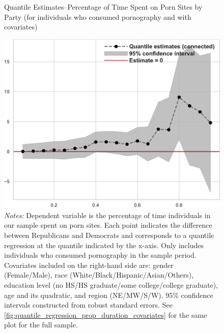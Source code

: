 \documentclass[12pt, letterpaper]{article}
\begin{document}
\begin{figure}[ht]
	\centering
	\caption{Quantile Estimates--Percentage of Time Spent on Porn Sites by Party (for individuals who consumed pornography and with covariates)}
	\includegraphics[width=.55\linewidth]{../figs/quantile_reg_nonzero_covariates_proportion_duration_adult.pdf}
	\caption*{\footnotesize \emph{Notes:} 
		Dependent variable is the percentage of time individuals in our sample spent on porn sites.
		Each point indicates the difference between Republicans and Democrats and corresponds to a quantile regression at the quantile indicated by the x-axis.
		Only includes individuals who consumed pornography in the sample period.
		Covariates included on the right-hand side are: gender (Female/Male), race (White/Black/Hispanic/Asian/Others), education level (no HS/HS graduate/some college/college graduate), age and its quadratic, and region (NE/MW/S/W).
		95\% confidence intervals constructed from robust standard errors.
		See \cref{fig:quantile_regression_prop_duration_covariates} for the same plot for the full sample.
	}
	\label{fig:quantile_regression_prop_duration_nonzeroes_covariates}
\end{figure}
\FloatBarrier

\end{document}
